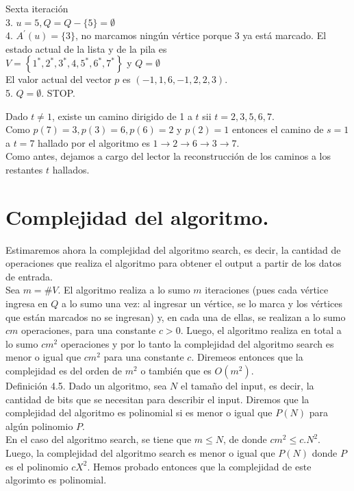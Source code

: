 \documentclass[10pt]{article}
\begin{document}
Sexta iteración\\
3. $u=5, Q=Q-\{5\}=\emptyset$\\
4. $A^{\prime}(u)=\{3\}$, no marcamos ningún vértice porque 3 ya está marcado. El estado actual de la lista y de la pila es\\
$V=\left\{1^{*}, 2^{*}, 3^{*}, 4,5^{*}, 6^{*}, 7^{*}\right\}$ y $Q=\emptyset$\\
El valor actual del vector $p$ es $(-1,1,6,-1,2,2,3)$.\\
5. $Q=\emptyset$. STOP.

Dado $t \neq 1$, existe un camino dirigido de 1 a $t$ sii $t=2,3,5,6,7$.\\
Como $p(7)=3, p(3)=6, p(6)=2$ y $p(2)=1$ entonces el camino de $s=1$ a $t=7$ hallado por el algoritmo es $1 \longrightarrow 2 \longrightarrow 6 \longrightarrow 3 \longrightarrow 7$.\\
Como antes, dejamos a cargo del lector la reconstrucción de los caminos a los restantes $t$ hallados.

\section*{Complejidad del algoritmo.}
Estimaremos ahora la complejidad del algoritmo search, es decir, la cantidad de operaciones que realiza el algoritmo para obtener el output a partir de los datos de entrada.\\
Sea $m=\# V$. El algoritmo realiza a lo sumo $m$ iteraciones (pues cada vértice ingresa en $Q$ a lo sumo una vez: al ingresar un vértice, se lo marca y los vértices que están marcados no se ingresan) y, en cada una de ellas, se realizan a lo sumo $c m$ operaciones, para una constante $c>0$. Luego, el algoritmo realiza en total a\\
lo sumo $c m^{2}$ operaciones y por lo tanto la complejidad del algoritmo search es menor o igual que $c m^{2}$ para una constante $c$. Diremeos entonces que la complejidad es del orden de $m^{2}$ o también que es $O\left(m^{2}\right)$.\\
Definición 4.5. Dado un algoritmo, sea $N$ el tamaño del input, es decir, la cantidad de bits que se necesitan para describir el input. Diremos que la complejidad del algoritmo es polinomial si es menor o igual que $P(N)$ para algún polinomio $P$.\\
En el caso del algoritmo search, se tiene que $m \leq N$, de donde $c m^{2} \leq c . N^{2}$. Luego, la complejidad del algoritmo search es menor o igual que $P(N)$ donde $P$ es el polinomio $c X^{2}$. Hemos probado entonces que la complejidad de este algorimto es polinomial.
\end{document}
